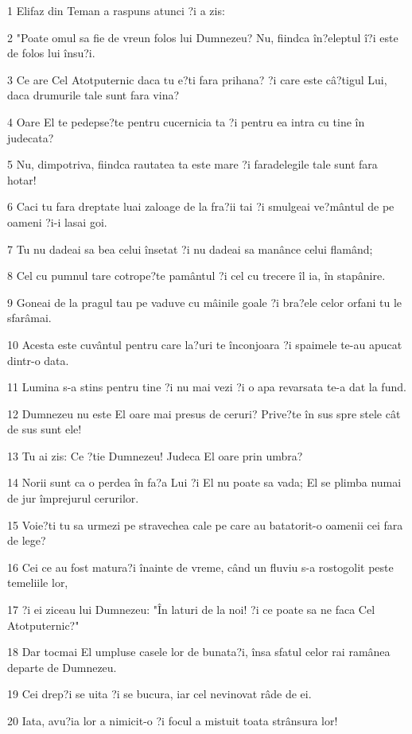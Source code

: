 \par 1 Elifaz din Teman a raspuns atunci ?i a zis:
\par 2 "Poate omul sa fie de vreun folos lui Dumnezeu? Nu, fiindca în?eleptul î?i este de folos lui însu?i.
\par 3 Ce are Cel Atotputernic daca tu e?ti fara prihana? ?i care este câ?tigul Lui, daca drumurile tale sunt fara vina?
\par 4 Oare El te pedepse?te pentru cucernicia ta ?i pentru ea intra cu tine în judecata?
\par 5 Nu, dimpotriva, fiindca rautatea ta este mare ?i faradelegile tale sunt fara hotar!
\par 6 Caci tu fara dreptate luai zaloage de la fra?ii tai ?i smulgeai ve?mântul de pe oameni ?i-i lasai goi.
\par 7 Tu nu dadeai sa bea celui însetat ?i nu dadeai sa manânce celui flamând;
\par 8 Cel cu pumnul tare cotrope?te pamântul ?i cel cu trecere îl ia, în stapânire.
\par 9 Goneai de la pragul tau pe vaduve cu mâinile goale ?i bra?ele celor orfani tu le sfarâmai.
\par 10 Acesta este cuvântul pentru care la?uri te înconjoara ?i spaimele te-au apucat dintr-o data.
\par 11 Lumina s-a stins pentru tine ?i nu mai vezi ?i o apa revarsata te-a dat la fund.
\par 12 Dumnezeu nu este El oare mai presus de ceruri? Prive?te în sus spre stele cât de sus sunt ele!
\par 13 Tu ai zis: Ce ?tie Dumnezeu! Judeca El oare prin umbra?
\par 14 Norii sunt ca o perdea în fa?a Lui ?i El nu poate sa vada; El se plimba numai de jur împrejurul cerurilor.
\par 15 Voie?ti tu sa urmezi pe stravechea cale pe care au batatorit-o oamenii cei fara de lege?
\par 16 Cei ce au fost matura?i înainte de vreme, când un fluviu s-a rostogolit peste temeliile lor,
\par 17 ?i ei ziceau lui Dumnezeu: "În laturi de la noi! ?i ce poate sa ne faca Cel Atotputernic?"
\par 18 Dar tocmai El umpluse casele lor de bunata?i, însa sfatul celor rai ramânea departe de Dumnezeu.
\par 19 Cei drep?i se uita ?i se bucura, iar cel nevinovat râde de ei.
\par 20 Iata, avu?ia lor a nimicit-o ?i focul a mistuit toata strânsura lor!
